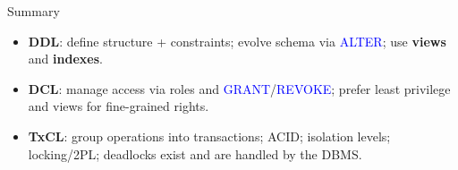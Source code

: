 \documentclass[10pt,aspectratio=169]{beamer}
\newcommand{\sqlk}[1]{\textcolor{blue}{#1}}
\begin{document}

\begin{frame}{Summary}
\small
\begin{itemize}
  \item \textbf{DDL}: define structure + constraints; evolve schema via \sqlk{ALTER}; use \textbf{views} and \textbf{indexes}.
  \item \textbf{DCL}: manage access via roles and \sqlk{GRANT}/\sqlk{REVOKE}; prefer least privilege and views for fine-grained rights.
  \item \textbf{TxCL}: group operations into transactions; ACID; isolation levels; locking/2PL; deadlocks exist and are handled by the DBMS.
\end{itemize}
\end{frame}
\end{document}
